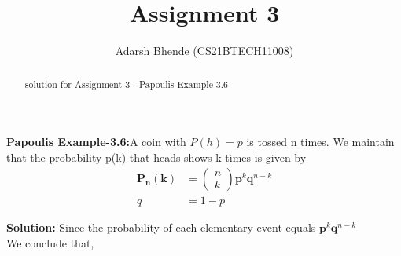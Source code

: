 \documentclass[journal,12pt,twocolumn]{IEEEtran}
\title{Assignment 3}
\author{ Adarsh Bhende (CS21BTECH11008)}
\theoremstyle{remark}
\newcommand{\myvec}[1]{\ensuremath{\begin{pmatrix}#1\end{pmatrix}}}
\let\vec\mathbf
\begin{document}
\maketitle
\begin{abstract}
 solution for Assignment 3 - Papoulis Example-3.6
\end{abstract}
\textbf{Papoulis Example-3.6:}A coin with $P(h)= p$ is tossed n times. We maintain that the probability p(k) that heads shows k times is given by\\
\begin{align}
\vec{P_{n}(k)} &= \myvec{n \\k }\vec{p}^k\vec{q}^{n-k}\\
q&=1-p
\end{align}

\textbf{Solution: } 
Since the probability of each elementary event equals
$\vec{p}^k\vec{q}^{n-k}$\\
We conclude that,\\
\end{document}
